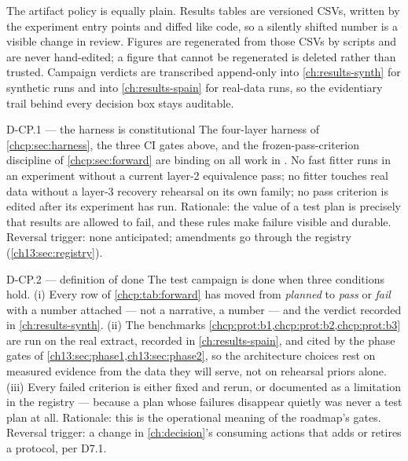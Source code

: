 The artifact policy is equally plain. Results tables are versioned CSVs, written by the experiment entry
points and diffed like code, so a silently shifted number is a visible change in review. Figures are
regenerated from those CSVs by scripts and are never hand-edited; a figure that cannot be regenerated is
deleted rather than trusted. Campaign verdicts are transcribed append-only into \cref{ch:results-synth} for
synthetic runs and into \cref{ch:results-spain} for real-data runs, so the evidentiary trail behind every
decision box stays auditable.

\begin{decision}{D-CP.1 --- the harness is constitutional}
The four-layer harness of \cref{chcp:sec:harness}, the three CI gates above, and the frozen-pass-criterion
discipline of \cref{chcp:sec:forward} are binding on all work in \modrepo{}. No fast fitter runs in an
experiment without a current layer-2 equivalence pass; no fitter touches real data without a layer-3 recovery
rehearsal on its own family; no pass criterion is edited after its experiment has run. Rationale: the value of
a test plan is precisely that results are allowed to fail, and these rules make failure visible and durable.
Reversal trigger: none anticipated; amendments go through the registry (\cref{ch13:sec:registry}).
\end{decision}

\begin{decision}{D-CP.2 --- definition of done}
The test campaign is done when three conditions hold. (i) Every row of \cref{chcp:tab:forward} has moved from
\emph{planned} to \emph{pass} or \emph{fail} with a number attached --- not a narrative, a number --- and the
verdict recorded in \cref{ch:results-synth}. (ii) The benchmarks \cref{chcp:prot:b1,chcp:prot:b2,chcp:prot:b3}
are run on the real extract, recorded in \cref{ch:results-spain}, and cited by the phase gates of
\cref{ch13:sec:phase1,ch13:sec:phase2}, so the architecture choices rest on measured evidence from the data
they will serve, not on rehearsal priors alone. (iii) Every failed criterion is either fixed and rerun, or
documented as a limitation in the registry --- because a plan whose failures disappear quietly was never a
test plan at all. Rationale: this is the operational meaning of the roadmap's gates. Reversal trigger: a
change in \cref{ch:decision}'s consuming actions that adds or retires a protocol, per D7.1.
\end{decision}
